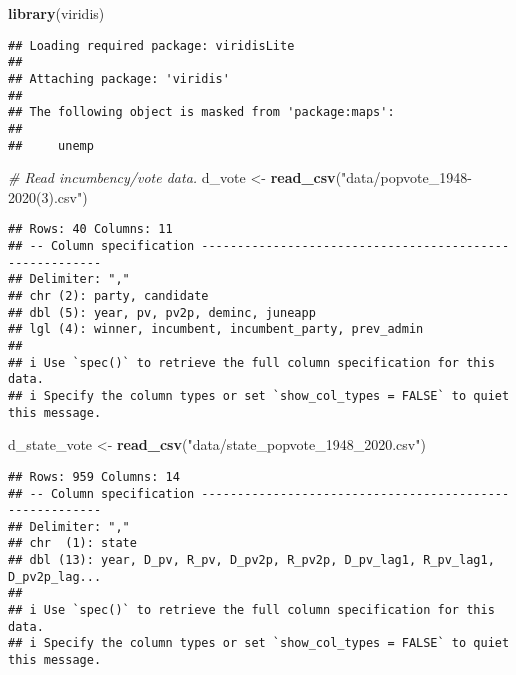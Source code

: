 \documentclass[
]{article}
\newenvironment{Shaded}{\begin{snugshade}}{\end{snugshade}}
\newcommand{\CommentTok}[1]{\textcolor[rgb]{0.56,0.35,0.01}{\textit{#1}}}
\newcommand{\FunctionTok}[1]{\textcolor[rgb]{0.13,0.29,0.53}{\textbf{#1}}}
\newcommand{\NormalTok}[1]{#1}
\newcommand{\OtherTok}[1]{\textcolor[rgb]{0.56,0.35,0.01}{#1}}
\newcommand{\StringTok}[1]{\textcolor[rgb]{0.31,0.60,0.02}{#1}}
\begin{document}
\begin{Shaded}
\begin{Highlighting}[]
\FunctionTok{library}\NormalTok{(viridis)}
\end{Highlighting}
\end{Shaded}

\begin{verbatim}
## Loading required package: viridisLite
## 
## Attaching package: 'viridis'
## 
## The following object is masked from 'package:maps':
## 
##     unemp
\end{verbatim}

\begin{Shaded}
\begin{Highlighting}[]
\CommentTok{\# Read incumbency/vote data.}
\NormalTok{d\_vote }\OtherTok{\textless{}{-}} \FunctionTok{read\_csv}\NormalTok{(}\StringTok{"data/popvote\_1948{-}2020(3).csv"}\NormalTok{)}
\end{Highlighting}
\end{Shaded}

\begin{verbatim}
## Rows: 40 Columns: 11
## -- Column specification --------------------------------------------------------
## Delimiter: ","
## chr (2): party, candidate
## dbl (5): year, pv, pv2p, deminc, juneapp
## lgl (4): winner, incumbent, incumbent_party, prev_admin
## 
## i Use `spec()` to retrieve the full column specification for this data.
## i Specify the column types or set `show_col_types = FALSE` to quiet this message.
\end{verbatim}

\begin{Shaded}
\begin{Highlighting}[]
\NormalTok{d\_state\_vote }\OtherTok{\textless{}{-}} \FunctionTok{read\_csv}\NormalTok{(}\StringTok{"data/state\_popvote\_1948\_2020.csv"}\NormalTok{)}
\end{Highlighting}
\end{Shaded}

\begin{verbatim}
## Rows: 959 Columns: 14
## -- Column specification --------------------------------------------------------
## Delimiter: ","
## chr  (1): state
## dbl (13): year, D_pv, R_pv, D_pv2p, R_pv2p, D_pv_lag1, R_pv_lag1, D_pv2p_lag...
## 
## i Use `spec()` to retrieve the full column specification for this data.
## i Specify the column types or set `show_col_types = FALSE` to quiet this message.
\end{verbatim}
\end{document}
